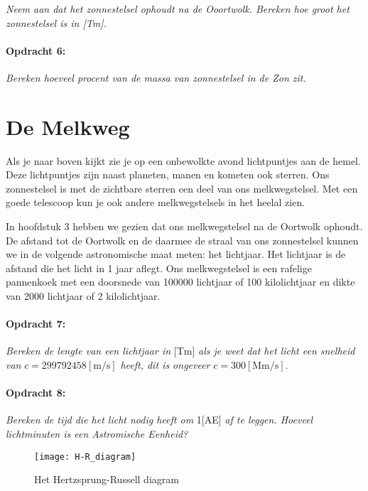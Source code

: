 \emph{Neem aan dat het zonnestelsel ophoudt na de Ooortwolk. Bereken
hoe groot het zonnestelsel is in {[}Tm{]}.}


\paragraph*{Opdracht 6:}

\emph{Bereken hoeveel procent van de massa van zonnestelsel in de
Zon zit.}


\section{De Melkweg}

Als je naar boven kijkt zie je op een onbewolkte avond lichtpuntjes
aan de hemel. Deze lichtpuntjes zijn naast pla\-neten, manen en kometen
ook sterren. Ons zonnestelsel is met de zichtbare sterren een deel
van ons melkwegstelsel. Met een goede telescoop kun je ook andere
melkwegstelsels in het heelal zien.

In hoofdstuk 3 hebben we gezien dat ons melkwegstelsel na de Oortwolk
ophoudt. De afstand tot de Oortwolk en de daarmee de straal van ons
zonnestelsel kunnen we in de volgende astronomische maat meten: het
lichtjaar. Het lichtjaar is de afstand die het licht in 1 jaar aflegt.
Ons melkwegstelsel is een rafelige pannenkoek met een doorsnede van
100000 lichtjaar of 100 kilolichtjaar en dikte van 2000 lichtjaar
of 2 kilolichtjaar.


\paragraph*{Opdracht 7:}

\emph{Bereken de lengte van een lichtjaar in} {[}Tm{]} \emph{als je
weet dat het licht een snelheid van} $c=299792458[\mathrm{m/s}]$
\emph{heeft, dit is ongeveer} $c=300[\mathrm{Mm/s}]$.


\paragraph*{Opdracht 8:}

\emph{Bereken de tijd die het licht nodig heeft om} 1{[}AE{]} \emph{af
te leggen. Hoeveel lichtminuten is een Astromische Eenheid?}

\begin{figure}[h]
\noindent \begin{centering}
\texttt{[image: H-R\_diagram]}
\par\end{centering}

\caption{Het Hertzsprung-Russell diagram\cite{hrdiagram}}
\end{figure}


